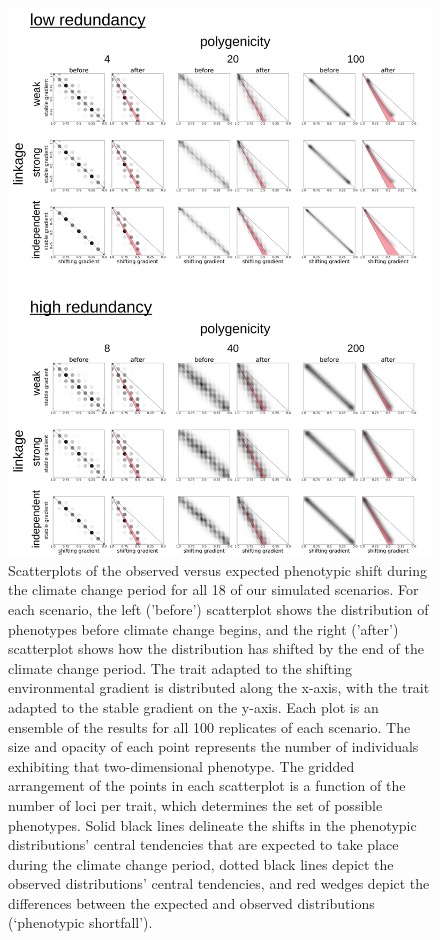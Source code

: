 \documentclass[9pt,twocolumn,twoside,lineno]{new_article}
\begin{document}
\begin{figure}
\centering
\includegraphics[width=15.8cm]{pub/figs_and_stats/FIG_4_phenotypic_shift.jpg}
\caption{Scatterplots of the observed versus expected phenotypic shift during the climate change period for all 18 of our simulated scenarios. For each scenario, the left ('before') scatterplot shows the distribution of phenotypes before climate change begins, and the right ('after') scatterplot shows how the distribution has shifted by the end of the climate change period. The trait adapted to the shifting environmental gradient is distributed along the x-axis, with the trait adapted to the stable gradient on the y-axis. Each plot is an ensemble of the results for all 100 replicates of each scenario. The size and opacity of each point represents the number of individuals exhibiting that two-dimensional phenotype. The gridded arrangement of the points in each scatterplot is a function of the number of loci per trait, which determines the set of possible phenotypes. Solid black lines delineate the shifts in the phenotypic distributions’ central tendencies that are expected to take place during the climate change period, dotted black lines depict the observed distributions’ central tendencies, and red wedges depict the differences between the expected and observed distributions (‘phenotypic shortfall’).
}
\label{fig:fig_4}
\end{figure}
\end{document}
